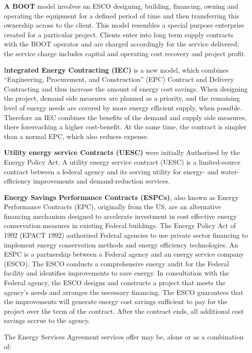 \documentclass[]{book}
\theoremstyle{definition}
\theoremstyle{definition}
\theoremstyle{definition}
\theoremstyle{remark}
\begin{document}
\textbf{A BOOT} model involves an ESCO designing, building, financing,
owning and operating the equipment for a defined period of time and then
transferring this ownership across to the client. This model resembles a
special purpose enterprise created for a particular project. Clients
enter into long term supply contracts with the BOOT operator and are
charged accordingly for the service delivered; the service charge
includes capital and operating cost recovery and project profit.

I\textbf{ntegrated Energy Contracting (IEC)} is a new model, which
combines ``Engineering, Procurement, and Construction'' (EPC) Contract
and Delivery Contracting and thus increase the amount of energy cost
savings. When designing the project, demand side measures are planned as
a priority, and the remaining level of energy needs are covered by more
energy efficient supply, when possible. Therefore an IEC combines the
benefits of the demand and supply side measures, there forereaching a
higher cost-benefit. At the same time, the contract is simpler than a
normal EPC, which also reduces expense.

\textbf{Utility energy service Contracts (UESC)} were initially
Authorized by the Energy Policy Act. A utility energy service contract
(UESC) is a limited-source contract between a federal agency and its
serving utility for energy- and water-efficiency improvements and
demand-reduction services.

\textbf{Energy Savings Performance Contracts (ESPCs)}, also known as
Energy Performance Contracts (EPC), originally from the US, are an
alternative financing mechanism designed to accelerate investment in
cost effective energy conservation measures in existing Federal
buildings. The Energy Policy Act of 1992 (EPACT 1992) authorized Federal
agencies to use private sector financing to implement energy
conservation methods and energy efficiency technologies. An ESPC is a
partnership between a Federal agency and an energy service company
(ESCO). The ESCO conducts a comprehensive energy audit for the Federal
facility and identifies improvements to save energy. In consultation
with the Federal agency, the ESCO designs and constructs a project that
meets the agency's needs and arranges the necessary financing. The ESCO
guarantees that the improvements will generate energy cost savings
sufficient to pay for the project over the term of the contract. After
the contract ends, all additional cost savings accrue to the agency.

The Energy Services Agreement services offer may be, alone or as a
combination of:
\end{document}
